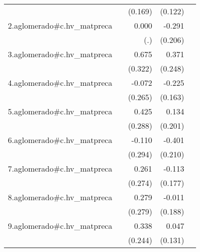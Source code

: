 {\begin{longtable}{l*{4}{D{.}{.}{-1}}}
            &                     &     (0.169)         &     (0.122)         &                     \\
\addlinespace
2.aglomerado#c.hv\_matpreca&                     &       0.000         &      -0.291         &                     \\
            &                     &         (.)         &     (0.206)         &                     \\
\addlinespace
3.aglomerado#c.hv\_matpreca&                     &       0.675\sym{*}  &       0.371         &                     \\
            &                     &     (0.322)         &     (0.248)         &                     \\
\addlinespace
4.aglomerado#c.hv\_matpreca&                     &      -0.072         &      -0.225         &                     \\
            &                     &     (0.265)         &     (0.163)         &                     \\
\addlinespace
5.aglomerado#c.hv\_matpreca&                     &       0.425         &       0.134         &                     \\
            &                     &     (0.288)         &     (0.201)         &                     \\
\addlinespace
6.aglomerado#c.hv\_matpreca&                     &      -0.110         &      -0.401         &                     \\
            &                     &     (0.294)         &     (0.210)         &                     \\
\addlinespace
7.aglomerado#c.hv\_matpreca&                     &       0.261         &      -0.113         &                     \\
            &                     &     (0.274)         &     (0.177)         &                     \\
\addlinespace
8.aglomerado#c.hv\_matpreca&                     &       0.279         &      -0.011         &                     \\
            &                     &     (0.279)         &     (0.188)         &                     \\
\addlinespace
9.aglomerado#c.hv\_matpreca&                     &       0.338         &       0.047         &                     \\
            &                     &     (0.244)         &     (0.131)         &                     \\

\end{longtable}}
